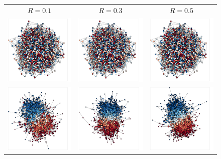 \documentclass[11pt]{article}
\begin{document}
\newpage
\begin{center} 
    \begin{figure}[H]
        \centering
    \begin{tabular}{ccc} 
        $R = 0.1$ & $R = 0.3$ & $R = 0.5$ \\
    \includegraphics[width=.15\linewidth]{../plots/networks/network_example_R0.1_0.pdf} & \includegraphics[width=.15\linewidth]{../plots/networks/network_example_R0.3_0.pdf} & \includegraphics[width=.15\linewidth]{../plots/networks/network_example_R0.5_0.pdf}\\ 
    \includegraphics[width=.15\linewidth]{../plots/networks/network_example_R0.1_2000.pdf} & \includegraphics[width=.15\linewidth]{../plots/networks/network_example_R0.3_2000.pdf} & \includegraphics[width=.15\linewidth]{../plots/networks/network_example_R0.5_2000.pdf}\\ 

\end{tabular}
\end{figure}
\end{center}
\end{document}
